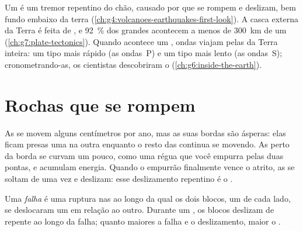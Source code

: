 \begin{recall}
Um \emph{} é um tremor repentino do chão, causado por  que
se rompem e deslizam, bem fundo embaixo da terra
(\cref{ch:g4:volcanoes-earthquakes-first-look}). A casca externa da Terra
é feita de , e 92~\% dos grandes  acontecem a menos de
\qty{300}{km} de um  (\cref{ch:g7:plate-tectonics}).
Quando acontece um , ondas viajam pelas  da Terra inteira:
um tipo mais rápido (as ondas~P) e um tipo mais lento (as ondas~S);
cronometrando-as, os cientistas descobriram o 
(\cref{ch:g6:inside-the-earth}).
\end{recall}

\section{Rochas que se rompem}

As  se movem alguns centímetros por ano, mas as suas bordas são
ásperas: elas ficam presas uma na outra enquanto o resto das 
continua se movendo. As  perto da borda se curvam um pouco, como uma
régua que você empurra pelas duas pontas, e acumulam energia. Quando o
empurrão finalmente vence o atrito, as  se soltam de uma vez e
deslizam: esse deslizamento repentino é o .

\begin{definition}[Falha]\label{def:g7:earthquakes:fault}
Uma \emph{falha} é uma ruptura nas  ao longo da qual os
dois blocos, um de cada lado, se deslocaram um em relação ao outro.
Durante um , os blocos deslizam de repente ao longo da falha;
quanto maiores a falha e o deslizamento, maior o .
\end{definition}

